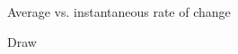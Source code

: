\begin{pa} \label{PA:3.6}
Average vs. instantaneous rate of change
\ba
	\item Draw 
\ea
\end{pa} 
\afterpa